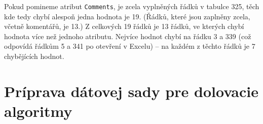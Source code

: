 \documentclass[10pt,xcolor=pdflatex,dvipsnames,table,oneside]{book}
\begin{document}
Pokud pomineme atribut \texttt{Comments}, je zcela vyplněných řádků v tabulce 325, těch kde tedy chybí alespoň jedna hodnota je 19. (Řádků, které jsou zaplněny zcela, včetně komentářů, je 13.)
Z celkových 19 řádků je 13 řádků, ve kterých chybí hodnota více než jednoho atributu. Nejvíce hodnot chybí na řádku 3 a 339 (což odpovídá řádkům 5 a 341 po otevření v Excelu) -- na každém z těchto řádků je 7 chybějících hodnot.



\chapter{Príprava dátovej sady pre dolovacie algoritmy}
\end{document}
